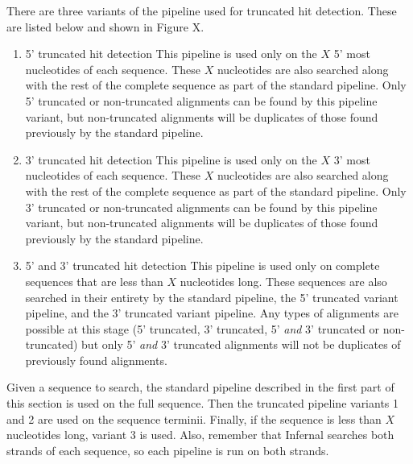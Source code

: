 \begin{sreoutput}
There are three variants of the pipeline used for truncated hit
detection. These are listed below and shown in Figure X. 

\begin{enumerate}

\item  5' truncated hit detection
This pipeline is used only on the $X$ 5' most nucleotides of each
sequence. These $X$ nucleotides are also searched along with the rest
of the complete sequence as part of the standard pipeline. Only 5'
truncated or non-truncated alignments can be found by this pipeline
variant, but non-truncated alignments will be duplicates of
those found previously by the standard pipeline. 

\item  3' truncated hit detection
This pipeline is used only on the $X$ 3' most nucleotides of each
sequence. These $X$ nucleotides are also searched along with the rest
of the complete sequence as part of the standard pipeline. Only 3'
truncated or non-truncated alignments can be found by this pipeline
variant, but non-truncated alignments will be duplicates of
those found previously by the standard pipeline. 

\item  5' and 3' truncated hit detection
This pipeline is used only on complete sequences that are less than
$X$ nucleotides long. These sequences are also searched in their
entirety by the standard pipeline, the 5' truncated variant pipeline,
and the 3' truncated variant pipeline. Any types of alignments are
possible at this stage (5' truncated, 3' truncated, 5' \emph{and} 3'
truncated or non-truncated) but only 5' \emph{and} 3' truncated
alignments will not be duplicates of previously found alignments. 

\end{enumerate}

Given a sequence to search, the standard pipeline described in the
first part of this section is used on the full sequence. Then the
truncated pipeline variants 1 and 2 are used on the sequence
terminii. Finally, if the sequence is less than $X$ nucleotides long,
variant 3 is used. Also, remember that Infernal searches both strands
of each sequence, so each pipeline is run on both strands.


\end{sreoutput}
